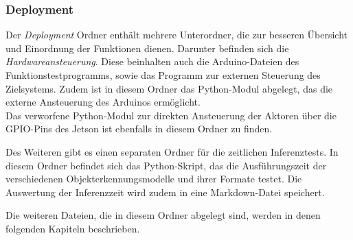 \subsubsection{Deployment}

Der \textit{Deployment} Ordner enthält mehrere Unterordner, die zur besseren Übersicht und Einordnung der Funktionen dienen. Darunter befinden sich die \textit{Hardwareansteuerung}. Diese beinhalten auch die Arduino-Dateien des Funktionstestprogramms, sowie das Programm zur externen Steuerung des Zielsystems. Zudem ist in diesem Ordner das Python-Modul abgelegt, das die externe Ansteuerung des Arduinos ermöglicht.
\\
Das verworfene Python-Modul zur direkten Ansteuerung der Aktoren über die \ac{GPIO}-Pins des Jetson ist ebenfalls in diesem Ordner zu finden.

Des Weiteren gibt es einen separaten Ordner für die zeitlichen Inferenztests. In diesem Ordner befindet sich das Python-Skript, das die Ausführungszeit der verschiedenen Objekterkennungsmodelle und ihrer Formate testet. Die Auswertung der Inferenzzeit wird zudem in eine Markdown-Datei speichert.

Die weiteren Dateien, die in diesem Ordner abgelegt sind, werden in denen folgenden Kapiteln beschrieben.

